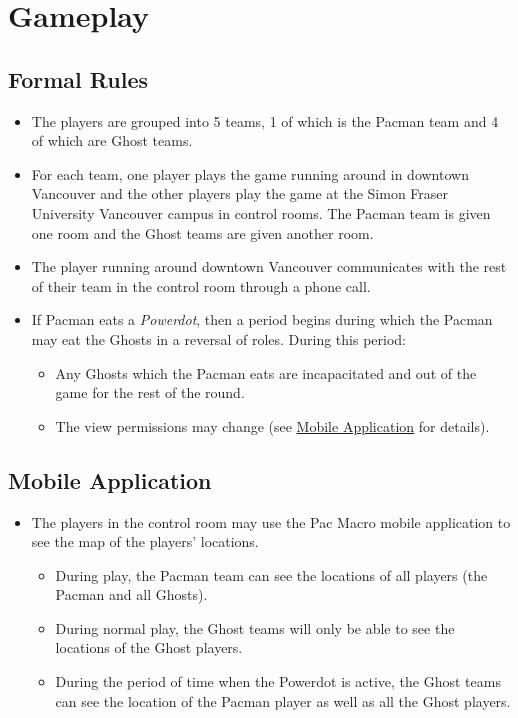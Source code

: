 \documentclass[10pt, oneside, letterpaper, titlepage]{article}
\begin{document}
	\section{Gameplay}
	\label{sec:gameplay}

	\subsection{Formal Rules}
	\label{subsec:gameplay:formal-rules}

	\begin{itemize}
		\item The players are grouped into 5 teams, 1 of which is the Pacman team and 4 of which are Ghost teams.
		\item For each team, one player plays the game running around in downtown Vancouver and the other players play the game at the Simon Fraser University Vancouver campus in control rooms. The Pacman team is given one room and the Ghost teams are given another room.
		\item The player running around downtown Vancouver communicates with the rest of their team in the control room through a phone call.
		\item If Pacman eats a \emph{Powerdot}, then a period begins during which the Pacman may eat the Ghosts in a reversal of roles. During this period:
		\begin{itemize}
			\item Any Ghosts which the Pacman eats are incapacitated and out of the game for the rest of the round.
			\item The view permissions may change (see \hyperref[subsec:gameplay:mobile-application]{Mobile Application} for details).
		\end{itemize}
	\end{itemize}

	\subsection{Mobile Application}
	\label{subsec:gameplay:mobile-application}

	\begin{itemize}
		\item The players in the control room may use the Pac Macro mobile application to see the map of the players' locations.
		\begin{itemize}
			\item During play, the Pacman team can see the locations of all players (the Pacman and all Ghosts).
			\item During normal play, the Ghost teams will only be able to see the locations of the Ghost players.
			\item During the period of time when the Powerdot is active, the Ghost teams can see the location of the Pacman player as well as all the Ghost players.
		\end{itemize}
	\end{itemize}
\end{document}
